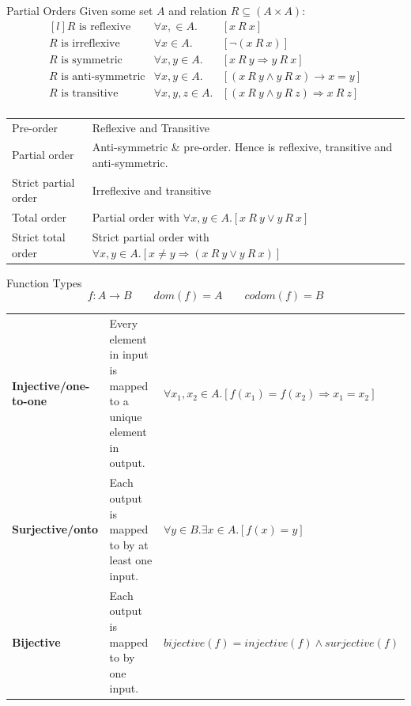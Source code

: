 \begin{definitionbox}{Partial Orders}
    Given some set $A$ and relation $R \subseteq (A \times A)$:
    \[\begin{matrix*}[l]
        R \text{ is reflexive} & \forall x, \in A . & [x \ R \ x] \\
        R \text{ is irreflexive} & \forall x \in A . & [\neg (x \ R \ x)] \\
        R \text{ is symmetric} & \forall x, y \in A . & [x \ R \ y \Rightarrow y \ R \ x] \\
        R \text{ is anti-symmetric} & \forall x, y \in A . & [(x \ R \ y \land y \ R \ x) \rightarrow x = y] \\
        R \text{ is transitive} & \forall x, y, z \in A . & [(x \ R \ y \land y \ R \ z) \Rightarrow x \ R \ z] \\
    \end{matrix*}\]
    \begin{center}
        \begin{tabular}{l l}
            Pre-order & Reflexive and Transitive \\
            Partial order & Anti-symmetric \& pre-order. Hence is reflexive, transitive and anti-symmetric. \\
            Strict partial order & Irreflexive and transitive \\
            Total order & Partial order with $\forall x, y \in A. [x \ R \ y \lor y \ R \ x]$ \\
            Strict total order & Strict partial order with $\forall x, y \in A. [x \neq y \Rightarrow (x \ R \ y \lor y \ R \ x)]$ \\
        \end{tabular}
    \end{center}

\end{definitionbox}
\begin{definitionbox}{Function Types}
    \[f: A \to B \qquad dom(f) = A \qquad codom(f) = B\]
    \begin{tabular}{l p{} l}
        \textbf{Injective/one-to-one} & Every element in input is mapped to a unique element in output. & $\forall x_1, x_2 \in A. [f(x_1) = f(x_2) \Rightarrow x_1 = x_2]$ \\
        \textbf{Surjective/onto} & Each output is mapped to by at least one input. & $\forall y \in B. \exists x \in A. [f(x) = y]$ \\
        \textbf{Bijective} & Each output is mapped to by one input. & $bijective(f) = injective(f) \land surjective(f)$ \\
    \end{tabular}
\end{definitionbox}
